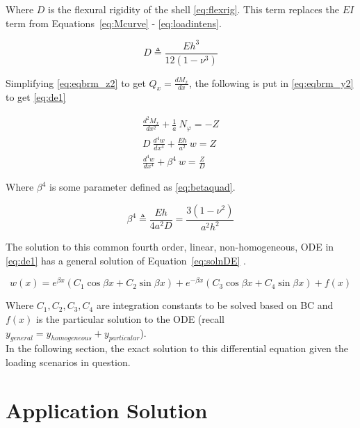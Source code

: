 Where $D$ is the flexural rigidity of the shell \ref{eq:flexrig}. This term replaces the $EI$ term from Equations~\ref{eq:Mcurve} - \ref{eq:loadintens}.

\begin{equation}
	\label{eq:flexrig}
	D \triangleq \frac{Eh^3}{12(1-\nu^3)}
\end{equation}

Simplifying \ref{eq:eqbrm_z2} to get $Q_x = \frac{dM_x}{dx}$, the following is put in \ref{eq:eqbrm_y2} to get \ref{eq:de1}

\begin{equation}
	\label{eq:de1}
	\begin{aligned}
		\frac{d^2M_x}{dx^2}+\frac{1}{a} \ N_\varphi = -Z \\
		D\ \frac{d^4w}{dx^4}+\frac{Eh}{a^2} \ w = Z      \\
		\frac{d^4w}{dx^4}+\beta^4 \ w = \frac{Z}{D}      
	\end{aligned}
\end{equation} 

Where $\beta^4$ is some parameter defined as \ref{eq:betaquad}.

\begin{equation}
	\label{eq:betaquad}
	\beta^4 \triangleq \frac{Eh}{4a^2D}= \frac{3(1-\nu^2)}{a^2h^2}
\end{equation}

The solution to this common fourth order, linear, non-homogeneous, ODE in \ref{eq:de1} has a general solution of Equation~\ref{eq:solnDE} \cite{timoshenko1959theory}.

\begin{equation}
	\label{eq:solnDE}
	w(x)=e^{\beta x} \left(C_1 \cos \beta x +C_2 \sin \beta x \right)+e^{-\beta x} \left(C_3 \cos \beta x +C_4 \sin \beta x \right) +f(x)
\end{equation}

Where $ C_1, C_2, C_3, C_4$ are integration constants to be solved based on BC and $f(x)$ is the particular solution to the ODE (recall $y_{general}=y_{homogeneous}+y_{particular}$).\\

In the following section, the exact solution to this differential equation given the loading scenarios in question.


\section{Application Solution}

